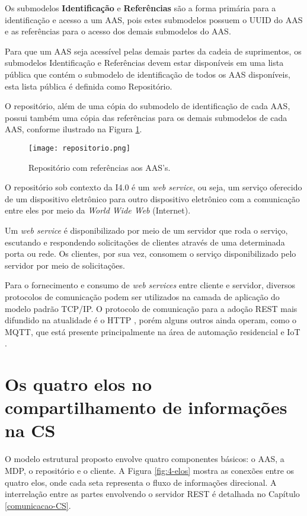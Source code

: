 	Os submodelos \textbf{Identificação} e \textbf{Referências} são a forma primária para a identificação e acesso a um AAS, pois estes submodelos possuem o UUID do AAS e as referências para o acesso dos demais submodelos do AAS.
	
	Para que um AAS seja acessível pelas demais partes da cadeia de suprimentos, os submodelos Identificação e Referências devem estar disponíveis em uma lista pública que contém o submodelo de identificação de todos os AAS disponíveis, esta lista pública é definida como Repositório.
	
	O repositório, além de uma cópia do submodelo de identificação de cada AAS, possui também uma cópia das referências para os demais submodelos de cada AAS, conforme ilustrado na Figura \ref{fig:repositorio}.
	
	
	\begin{figure}[hbt!]
		\centering
		\caption{Repositório com referências aos AAS's.}
		\texttt{[image: repositorio.png]}
		\label{fig:repositorio}
	\end{figure}
	
	O repositório sob contexto da I4.0 é um \textit{web service}, ou seja, um serviço oferecido de um dispositivo eletrônico para outro dispositivo eletrônico com a comunicação entre eles por meio da \textit{World Wide Web} (Internet).
	
	Um \textit{web service} é disponibilizado por meio de um servidor que roda o serviço, escutando e respondendo solicitações de clientes através de uma determinada porta ou rede. Os clientes, por sua vez, consomem o serviço disponibilizado pelo servidor por meio de solicitações.
	
	Para o fornecimento e consumo de \textit{web services} entre cliente e servidor, diversos protocolos de comunicação podem ser utilizados na camada de aplicação do modelo padrão TCP/IP. O protocolo de comunicação para a adoção REST mais difundido na atualidade é o HTTP \cite{gruner2016restful}, porém alguns outros ainda operam, como o MQTT, que está presente principalmente na área de automação residencial e IoT \cite{yokotani2016mqtt}.
	
	
\section{Os quatro elos no compartilhamento de informações na CS}
	
	O modelo estrutural proposto envolve quatro componentes básicos: o AAS, a MDP, o repositório e o cliente. A Figura \ref{fig:4-elos} mostra as conexões entre os quatro elos, onde cada seta representa o fluxo de informações direcional. A interrelação entre as partes envolvendo o servidor REST é detalhada no Capítulo \ref{comunicacao-CS}.
	
